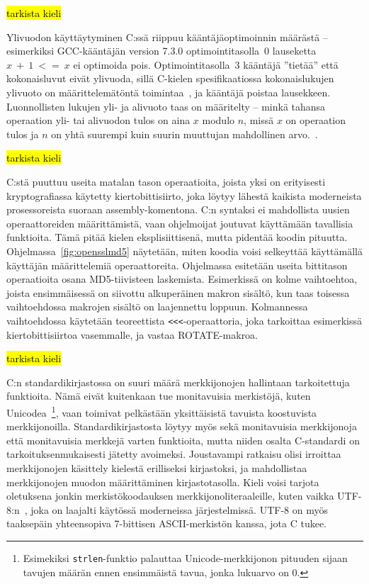 \hl{tarkista kieli}

Ylivuodon käyttäytyminen C:ssä riippuu kääntäjäoptimoinnin määrästä --
esimerkiksi GCC-kääntäjän version 7.3.0 optimointitasolla~0 lauseketta
$x~+~1~<=~x$ ei optimoida pois. Optimointitasolla~3 kääntäjä ''tietää'' että
kokonaisluvut eivät ylivuoda, sillä \mbox{C-kielen} spesifikaatiossa
kokonaislukujen ylivuoto on määrittelemätöntä toimintaa~\citep[liite J, luku J.2]{C18}, ja kääntäjä poistaa lausekkeen.
Luonnollisten lukujen yli- ja alivuoto taas on määritelty -- minkä tahansa
operaation yli- tai alivuodon tulos on aina $x$ modulo $n$, missä $x$ on
operaation tulos ja $n$ on yhtä suurempi kuin suurin muuttujan mahdollinen
arvo.~\citep[luku 6.2.5]{C18}.

\hl{tarkista kieli}

C:stä puuttuu useita matalan tason operaatioita, joista yksi on erityisesti
kryptografiassa käytetty kiertobittisiirto, joka
löytyy lähestä kaikista moderneista prosessoreista suoraan assembly-komentona.
C:n syntaksi ei mahdollista uusien operaattoreiden määrittämistä, vaan
ohjelmoijat joutuvat käyttämään tavallisia funktioita. Tämä pitää kielen
eksplisiittisenä, mutta pidentää koodin pituutta.
Ohjelmassa~\ref{fig:opensslmd5} näytetään, miten koodia voisi selkeyttää
käyttämällä käyttäjän määrittelemiä operaattoreita. Ohjelmassa esitetään useita
bittitason operaatioita osana MD5-tiivisteen laskemista. Esimerkissä on kolme
vaihtoehtoa, joista ensimmäisessä on siivottu alkuperäinen makron sisältö, kun
taas toisessa vaihtoehdossa makrojen sisältö on laajennettu loppuun.
Kolmannessa vaihtoehdossa käytetään teoreettista \texttt{<<<}-operaattoria,
joka tarkoittaa esimerkissä kiertobittisiirtoa vasemmalle, ja vastaa
ROTATE-makroa.

\hl{tarkista kieli}

C:n standardikirjastossa on suuri määrä merkkijonojen hallintaan tarkoitettuja
funktioita. Nämä eivät kuitenkaan tue monitavuisia merkistöjä, kuten Unicodea~\citep{unicode11}\footnote{Esimekiksi
\texttt{strlen}-funktio palauttaa Unicode-merkkijonon pituuden sijaan tavujen
määrän ennen ensimmäistä tavua, jonka lukuarvo on 0.}, vaan toimivat pelkästään
yksittäisistä tavuista koostuvista merkkijonoilla. Standardikirjastosta löytyy
myös sekä monitavuisia merkkijonoja että monitavuisia merkkejä varten
funktioita, mutta niiden osalta C-standardi on tarkoituksenmukaisesti jätetty
avoimeksi. Joustavampi ratkaisu olisi irroittaa merkkijonojen käsittely
kielestä erilliseksi kirjastoksi, ja mahdollistaa merkkijonojen muodon
määrittäminen kirjastotasolla. Kieli voisi tarjota oletuksena jonkin
merkistökoodauksen merkkijonoliteraaleille, kuten vaikka
UTF-8:n~\citep[s. 36]{unicode11}, joka on laajalti käytössä moderneissa
järjestelmissä. UTF-8 on myös taaksepäin yhteensopiva 7-bittisen
ASCII-merkistön kanssa, jota C tukee.

